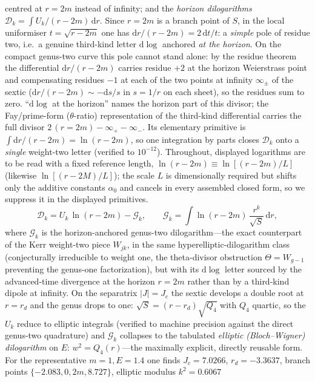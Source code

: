 \documentclass[12pt]{iopart}
\newcommand{\Jc}{J_{c}}
\newcommand{\dd}{\mathrm{d}}
\begin{document}
centred at $r=2m$ instead of infinity; and
the \emph{horizon dilogarithms} $\mathcal{D}_k=\int U_k/(r-2m)\,\dd r$. Since $r=2m$
is a branch point of $S$, in the local uniformiser $t=\sqrt{r-2m}$ one has
$\dd r/(r-2m)=2\,\dd t/t$: a \emph{simple} pole of residue two, i.e.\ a genuine
third-kind letter $\dd\log$ anchored \emph{at the horizon}. On the compact
genus-two curve this pole cannot stand alone: by the residue theorem the
differential $\dd r/(r-2m)$ carries residue $+2$ at the horizon Weierstrass point
and compensating residues $-1$ at each of the two points at infinity $\infty_\pm$ of
the sextic ($\dd r/(r-2m)\sim-\dd s/s$ in $s=1/r$ on each sheet), so the residues sum
to zero. ``$\dd\log$ at the horizon'' names the horizon part of this divisor; the
Fay/prime-form ($\theta$-ratio) representation of the third-kind differential carries
the full divisor $2\,(r{=}2m)-\infty_+-\infty_-$. Its elementary primitive
is $\int\dd r/(r-2m)=\ln(r-2m)$, so one integration by parts closes $\mathcal{D}_k$
onto a \emph{single} weight-two letter (verified to $10^{-12}$). Throughout, displayed
logarithms are to be read with a fixed reference length, $\ln(r-2m)\equiv\ln[(r-2m)/L]$
(likewise $\ln[(r-2M)/L]$); the scale $L$ is dimensionally required but shifts only the
additive constants $\alpha_0$ and cancels in every assembled closed form, so we suppress
it in the displayed primitives.
\begin{equation}
    \mathcal{D}_k=U_k\,\ln(r-2m)-\mathcal{G}_k,\qquad
    \mathcal{G}_k=\int\ln(r-2m)\,\frac{r^k}{\sqrt S}\,\dd r,
    \label{eq:horizon-dilog}
\end{equation}
where $\mathcal{G}_k$ is the horizon-anchored genus-two dilogarithm---the exact
counterpart of the Kerr weight-two piece $W_{jk}$, in the same
hyperelliptic-dilogarithm class (conjecturally irreducible to weight one, the
theta-divisor obstruction $\Theta=W_{g-1}$ preventing the genus-one factorization),
but with its $\dd\log$ letter sourced by the
advanced-time divergence at the horizon $r=2m$ rather than by a third-kind dipole at
infinity. On the separatrix $|J|=\Jc$ the sextic develops a double root at $r=r_d$
and the genus drops to one: $\sqrt S=(r-r_d)\sqrt{Q_4}$ with $Q_4$ quartic, so the
$U_k$ reduce to elliptic integrals (verified to machine precision against the direct
genus-two quadrature) and $\mathcal{G}_k$ collapses to the tabulated \emph{elliptic
(Bloch--Wigner) dilogarithm} on $E:\,w^2=Q_4(r)$---the maximally explicit, directly
reusable form. For the representative $m=1,E=1.4$ one finds $\Jc=7.0266$,
$r_d=-3.3637$, branch points $\{-2.083,0,2m,8.727\}$, elliptic modulus $k^2=0.6067$
\end{document}
